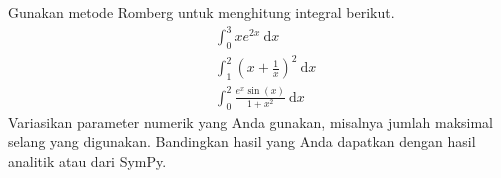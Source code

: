 \begin{soal}
Gunakan metode Romberg untuk menghitung integral berikut.
\begin{align}
& \int_{0}^{3} x e^{2x}\ \mathrm{d}x \\
& \int_{1}^{2} \left( x + \frac{1}{x} \right)^2 \ \mathrm{d}x \\
& \int_{0}^{2} \frac{e^{x}\sin(x)}{1 + x^2}\ \mathrm{d}x
\end{align}
Variasikan parameter numerik yang Anda gunakan, misalnya jumlah maksimal selang
yang digunakan.
Bandingkan hasil yang Anda dapatkan dengan hasil analitik atau dari SymPy.
\end{soal}